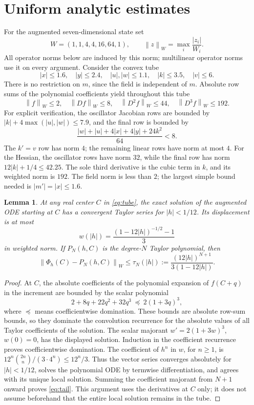 \documentclass[11pt]{article}
\newtheorem{lemma}{Lemma}
\newcommand{\norm}[1]{\left\lVert#1\right\rVert}
\begin{document}
\section{Uniform analytic estimates}
For the augmented seven-dimensional state set
\[
 W=(1,1,4,4,16,64,1),\qquad
 \norm{z}_W=\max_i\frac{|z_i|}{W_i}.
\]
All operator norms below are induced by this norm; multilinear operator
norms use it on every argument. Consider the convex tube
\begin{equation}\label{eq:tube}
 |x|\le1.6,\quad |y|\le2.4,\quad |u|,|w|\le1.1,
 \quad |k|\le3.5,\quad |v|\le6.
\end{equation}
There is no restriction on $m$, since the field is independent of $m$.
Absolute row sums of the polynomial coefficients yield throughout this tube
\begin{equation}\label{eq:derivatives}
 \norm{f}_W\le2,\quad \norm{Df}_W\le8,\quad
 \norm{D^2f}_W\le44,\quad \norm{D^3f}_W\le192.
\end{equation}
For explicit verification, the oscillator Jacobian rows are bounded by
$|k|+4\max(|u|,|w|)\le7.9$, and the final row is bounded by
\[
 \frac{|w|+|u|+4|x|+4|y|+24k^2}{64}<8.
\]
The $k'=v$ row has norm $4$; the remaining linear rows have norm at most
$4$. For the Hessian, the oscillator rows have norm $32$, while the
final row has norm $12|k|+1/4\le42.25$. The sole third derivative is
the cubic term in $k$, and its weighted norm is $192$.
The field norm is less than $2$; the largest simple bound needed is
$|m'|=|x|\le1.6$.

\begin{lemma}\label{lem:taylor}
At any real center $C$ in \eqref{eq:tube}, the exact solution of the
augmented ODE starting at $C$ has a convergent Taylor series for
$|h|<1/12$. Its displacement is at most
\[
 w(|h|)=\frac{(1-12|h|)^{-1/2}-1}{3}
\]
in weighted norm. If $P_N(h,C)$ is the degree-$N$ Taylor polynomial, then
\begin{equation}\label{eq:tail}
 \norm{\Phi_h(C)-P_N(h,C)}_W
 \le\tau_N(|h|):=\frac{(12|h|)^{N+1}}{3(1-12|h|)}.
\end{equation}
\end{lemma}
\begin{proof}
At $C$, the absolute coefficients of the polynomial expansion of
$f(C+q)$ in the increment are bounded by the scalar polynomial
\[
 2+8q+22q^2+32q^3\ \preceq\ 2(1+3q)^3,
\]
where $\preceq$ means coefficientwise domination. These bounds are
absolute row-sum bounds, so they dominate the convolution recurrence for
the absolute values of all Taylor coefficients of the solution. The scalar
majorant $w'=2(1+3w)^3$, $w(0)=0$, has the displayed solution. Induction
in the coefficient recurrence proves coefficientwise domination. The
coefficient of $h^n$ in $w$, for $n\ge1$, is
$12^n\binom{2n}{n}/(3\cdot4^n)\le12^n/3$.
Thus the vector series converges absolutely for $|h|<1/12$, solves the
polynomial ODE by termwise differentiation, and agrees with its unique
local solution. Summing the coefficient majorant from $N+1$ onward proves
\eqref{eq:tail}. This argument uses the derivatives at $C$ only; it does
not assume beforehand that the entire local solution remains in the tube.
\end{proof}
\end{document}
